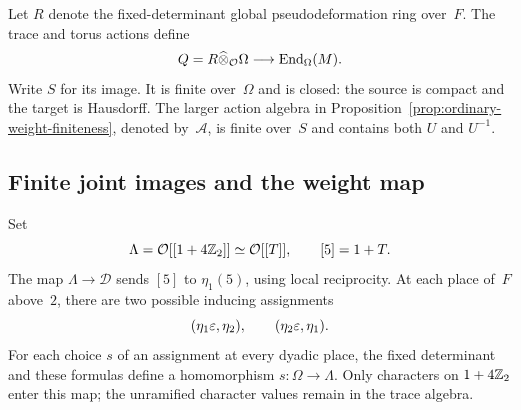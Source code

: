 Let $R$ denote the fixed-determinant global pseudodeformation ring
over~$F$.  The trace and torus actions define
\[
 Q=R\widehat\otimes_{\mathcal O}\Omega
       \longrightarrow\operatorname{End}_\Omega(M).
\]
Write $S$ for its image.  It is finite over~$\Omega$ and is closed:
the source is compact and the target is Hausdorff.  The larger action
algebra in Proposition~\ref{prop:ordinary-weight-finiteness}, denoted
by~$\mathcal A$, is finite over~$S$ and contains both $U$ and $U^{-1}$.

\subsection{Finite joint images and the weight map}

Set
\[
 \Lambda=\mathcal O[[1+4\mathbb Z_2]]\simeq\mathcal O[[T]],\qquad
 [5]=1+T.
\]
The map $\Lambda\to\mathscr D$ sends $[5]$ to $\eta_1(5)$, using local
reciprocity.  At each place of~$F$ above~$2$, there are two possible
inducing assignments
\begin{equation}\label{eq:two-ordinary-orders}
 (\eta_1\varepsilon,\eta_2),\qquad (\eta_2\varepsilon,\eta_1).
\end{equation}
For each choice $s$ of an assignment at every dyadic place, the fixed
determinant and these formulas define a homomorphism
$s:\Omega\to\Lambda$.  Only characters on $1+4\mathbb Z_2$ enter this map;
the unramified character values remain in the trace algebra.

